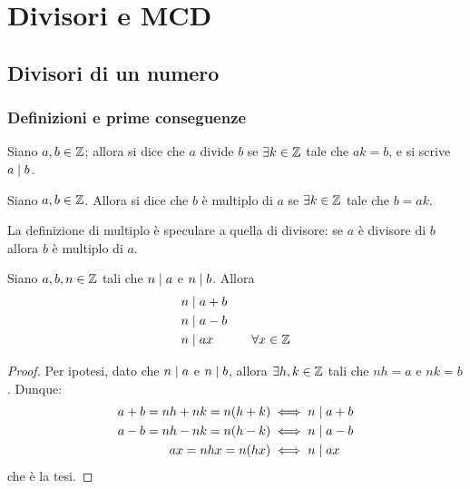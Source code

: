 \chapter{Divisori e MCD}

\section{Divisori di un numero}

\subsection{Definizioni e prime conseguenze}

\begin{definition}[Divisore]
    Siano $a, b \in \mathbb{Z}$; allora si dice che $a$ divide $b$ se
    $\exists k \in \mathbb{Z}$ tale che $ak = b$, e si scrive $a \mid b$.
\end{definition}

\begin{definition}[Multiplo]
    Siano $a, b \in \mathbb{Z}$. Allora si dice che $b$ è multiplo di $a$ se $\exists k \in \mathbb{Z}$ tale che $b = ak$.
\end{definition}
\begin{remark}
    La definizione di multiplo è speculare a quella di divisore: se $a$ è divisore di $b$ allora $b$ è multiplo di $a$.
\end{remark}

\begin{proposition} \label{divides_sum_subtr_mult}
    Siano $a, b, n \in \mathbb{Z}$ tali che $n \mid a$ e $n \mid b$. Allora
    \begin{alignat}{2}
        &n \mid a + b \label{divides_sum}\\
        &n \mid a - b \label{divides_subtr} \\
        &n \mid ax \qquad&\forall x \in \mathbb{Z} \label{divides_mult}
    \end{alignat} 
\end{proposition}
\begin{proof}  
    Per ipotesi, dato che $n \mid a$ e $n \mid b$, allora $\exists h, k \in \mathbb{Z}$ tali che
    $nh = a$ e $nk = b$. Dunque:
    \begin{alignat*}{2}
        a + b = nh + nk = n(h + k) &\iff n \mid a + b \\
        a - b = nh - nk = n(h - k) &\iff n \mid a - b \\
        ax = nhx = n(hx) &\iff n \mid ax
    \end{alignat*}
    che è la tesi.
\end{proof}

